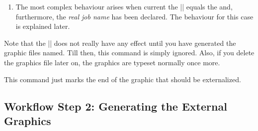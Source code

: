 \begin{command}{\beginpgfgraphicnamed{}}
\begin{enumerate}
            When the text is ``ignored'', what actually happens is that all
            text up to the next occurrence of |\endpgfgraphicnamed| is thrown
            away without any macro expansion. This means, in particular, that
            (a) you cannot put |\endpgfgraphicnamed| inside a macro and (b) the
            macros used in the graphics need not be defined at all when the
            graphic file is included. \item The most complex behaviour arises
            when current the |\jobname| equals the  and,
            furthermore, the \emph{real job name} has been declared. The
            behaviour for this case is explained later.
    \end{enumerate}

    Note that the |\beginpgfgraphicnamed| does not really have any effect until
    you have generated the graphic files named. Till then, this command is
    simply ignored. Also, if you delete the graphics file later on, the
    graphics are typeset normally once more.
\end{command}

\begin{command}{\endpgfgraphicnamed}
    This command just marks the end of the graphic that should be externalized.
\end{command}


\subsection{Workflow Step 2: Generating the External Graphics}

